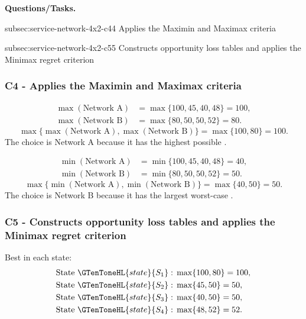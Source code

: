 	\textbf{Questions/Tasks.}
	\begin{enumerate}
		\CriterionTask
		{subsec:service-network-4x2-c4}{4}
		{Applies the Maximin and Maximax criteria}

		\CriterionTask
		{subsec:service-network-4x2-c5}{5}
		{Constructs opportunity loss tables and applies the Minimax regret criterion}
	\end{enumerate}
	
	\subsubsection*{C4 - Applies the Maximin and Maximax criteria}
	\label{subsec:service-network-4x2-c4}
	
	\[
	\begin{aligned}
		\max(\text{Network A}) &= \max\{100,45,40,48\}=100,\\
		\max(\text{Network B}) &= \max\{80,50,50,52\}=80.
	\end{aligned}
	\]
	\[
	\max\{\max(\text{Network A}),\max(\text{Network B})\}
	=\max\{100,80\}
	=100.
	\]
	The  choice is Network A because it has the highest possible .
	
	\[
	\begin{aligned}
		\min(\text{Network A}) &= \min\{100,45,40,48\}=40,\\
		\min(\text{Network B}) &= \min\{80,50,50,52\}=50.
	\end{aligned}
	\]
	\[
	\max\{\min(\text{Network A}),\min(\text{Network B})\}
	=\max\{40,50\}
	=50.
	\]
	The  choice is Network B because it has the largest worst-case .
	
	\subsubsection*{C5 - Constructs opportunity loss tables and applies the Minimax regret criterion}
	\label{subsec:service-network-4x2-c5}
	
	Best  in each state:
	\[
	\begin{aligned}
		\text{State }\GTenToneHL{state}{S_1}:\;&\max\{100,80\}=100,\\
		\text{State }\GTenToneHL{state}{S_2}:\;&\max\{45,50\}=50,\\
		\text{State }\GTenToneHL{state}{S_3}:\;&\max\{40,50\}=50,\\
		\text{State }\GTenToneHL{state}{S_4}:\;&\max\{48,52\}=52.
	\end{aligned}
	\]
	
